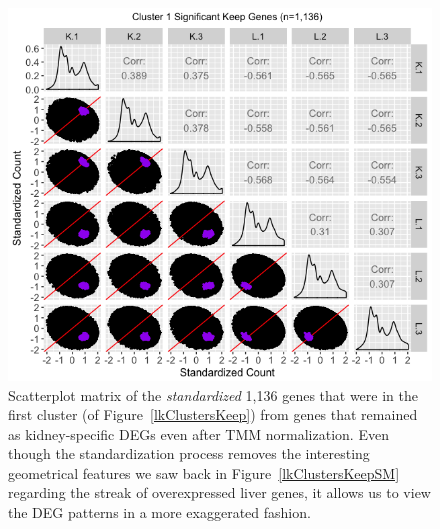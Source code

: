 \documentclass{article}
\begin{document}
\null
\begin{figure}[t!]
\centerline{\includegraphics[width=1\columnwidth]{../MakeFigures/lkClustersKeepSM-St.jpg}}
\caption{Scatterplot matrix of the \textit{standardized} 1,136 genes that were in the first cluster (of Figure~\ref{lkClustersKeep}) from genes that remained as kidney-specific DEGs even after TMM normalization. Even though the standardization process removes the interesting geometrical features we saw back in Figure~\ref{lkClustersKeepSM} regarding the streak of overexpressed liver genes, it allows us to view the DEG patterns in a more exaggerated fashion.
\label{lkClustersKeepSM-St}}
\end{figure}
\end{document}

